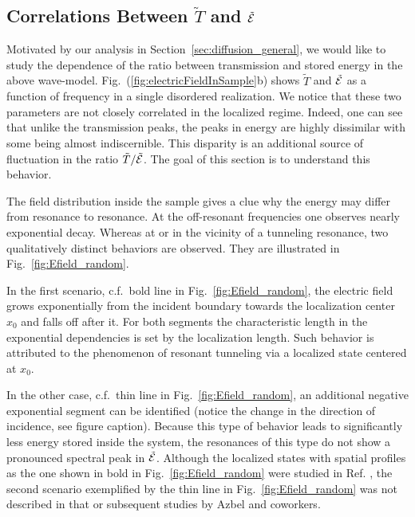 \subsection{Correlations Between \texorpdfstring{$\tilde{T}$}{T} and \texorpdfstring{$\tilde{\cal E}$}{E}}
\label{sec:correlation_te}

Motivated by our analysis in Section~\ref{sec:diffusion_general}, we would like to study the dependence of the ratio between transmission and stored energy in the above wave-model. Fig.~(\ref{fig:electricFieldInSample}b) shows $\tilde{T}$ and $\tilde{\cal E}$ as a function of frequency in a single disordered realization. We notice that these two parameters are not closely correlated in the localized regime. Indeed, one can see that unlike the transmission peaks, the peaks in energy are highly dissimilar with some being almost indiscernible. This disparity is an additional source of fluctuation in the ratio  $\tilde{T}/\tilde{\cal E}$. The goal of this section is to understand this behavior.

The field distribution inside the sample gives a clue why the energy may differ from resonance to resonance. At the off-resonant frequencies one observes nearly exponential decay. Whereas at or in the vicinity of a tunneling resonance, two qualitatively distinct behaviors are observed. They are illustrated in Fig.~\ref{fig:Efield_random}.

In the first scenario, c.f.~bold line in Fig.~\ref{fig:Efield_random}, the electric field grows exponentially from the incident boundary towards the localization center $x_0$ and falls off after it. For both segments the characteristic length in the exponential dependencies is set by the localization length. Such behavior is attributed\cite{1983_Azbel_zeroTemp} to the phenomenon of resonant tunneling via a localized state centered at $x_0$. 

In the other case, c.f.~thin line in Fig.~\ref{fig:Efield_random}, an additional negative exponential segment can be identified (notice the change in the direction of incidence, see figure caption). Because this type of behavior leads to significantly less energy stored inside the system, the resonances of this type do not show a pronounced spectral peak in $\tilde{\cal E}$. Although the localized states with spatial profiles as the one shown in bold in Fig.~\ref{fig:Efield_random} were studied in Ref. \cite{1983_Azbel_zeroTemp}, the second scenario exemplified by the thin line in Fig.~\ref{fig:Efield_random} was not described in that or subsequent studies by Azbel and coworkers.

